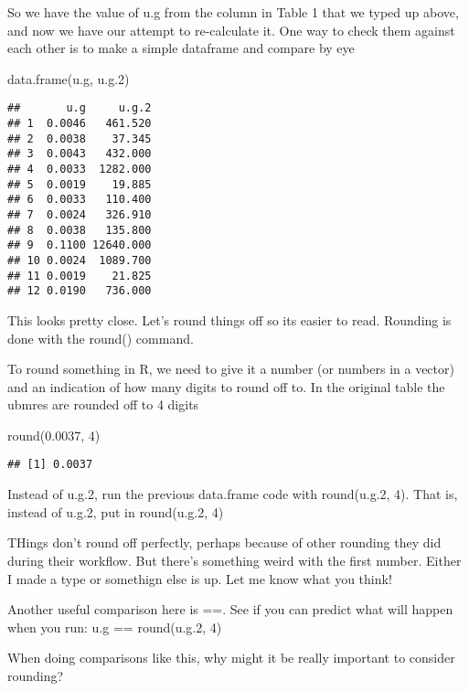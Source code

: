 \documentclass[
]{book}
\newenvironment{Shaded}{\begin{snugshade}}{\end{snugshade}}
\newcommand{\DecValTok}[1]{\textcolor[rgb]{0.00,0.00,0.81}{#1}}
\newcommand{\FloatTok}[1]{\textcolor[rgb]{0.00,0.00,0.81}{#1}}
\newcommand{\FunctionTok}[1]{\textcolor[rgb]{0.00,0.00,0.00}{#1}}
\newcommand{\NormalTok}[1]{#1}
\begin{document}
So we have the value of u.g from the column in Table 1 that we typed up above, and now we have our attempt to re-calculate it. One way to check them against each other is to make a simple dataframe and compare by eye

\begin{Shaded}
\begin{Highlighting}[]
\FunctionTok{data.frame}\NormalTok{(u.g, u.g}\FloatTok{.2}\NormalTok{)}
\end{Highlighting}
\end{Shaded}

\begin{verbatim}
##       u.g     u.g.2
## 1  0.0046   461.520
## 2  0.0038    37.345
## 3  0.0043   432.000
## 4  0.0033  1282.000
## 5  0.0019    19.885
## 6  0.0033   110.400
## 7  0.0024   326.910
## 8  0.0038   135.800
## 9  0.1100 12640.000
## 10 0.0024  1089.700
## 11 0.0019    21.825
## 12 0.0190   736.000
\end{verbatim}

This looks pretty close. Let's round things off so its easier to read. Rounding is done with the round() command.

To round something in R, we need to give it a number (or numbers in a vector) and an indication of how many digits to round off to. In the original table the ubmres are rounded off to 4 digits

\begin{Shaded}
\begin{Highlighting}[]
\FunctionTok{round}\NormalTok{(}\FloatTok{0.0037}\NormalTok{, }\DecValTok{4}\NormalTok{)}
\end{Highlighting}
\end{Shaded}

\begin{verbatim}
## [1] 0.0037
\end{verbatim}

Instead of u.g.2, run the previous data.frame code with round(u.g.2, 4). That is, instead of u.g.2, put in round(u.g.2, 4)

THings don't round off perfectly, perhaps because of other rounding they did during their workflow. But there's something weird with the first number. Either I made a type or somethign else is up. Let me know what you think!

Another useful comparison here is ==. See if you can predict what will happen when you run:
u.g == round(u.g.2, 4)

When doing comparisons like this, why might it be really important to consider rounding?
\end{document}
